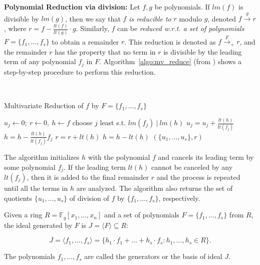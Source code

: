 {\bf Polynomial Reduction via division:} Let $f, g$ be
polynomials. If $lm(f)$ is divisible by $lm(g)$, then we say that $f$
{\it is reducible to} $r$ modulo $g$, denoted
$f\stackrel{g}{\textstyle\longrightarrow}r$, where
$r = f - {\frac{lt(f)}{lt(g)}} \cdot g$. Similarly, $f$ can be {\it
  reduced  w.r.t. a set of polynomials}  $F = \{f_1, \dots, f_s\}$ to
obtain a remainder $r$. This reduction is denoted as $f \stackrel{F}
{\textstyle \longrightarrow}_+ r$, and the remainder $r$ has the
property that no term in $r$ is divisible by the leading term of any
polynomial $f_j$ in $F$. Algorithm~\ref{algo:mv_reduce}
(from \cite{gb_book}) shows a step-by-step procedure to perform this
reduction.   

\ \\
\begin{algorithm}[hbt]
 \caption{Multivariate Reduction of $f$ by $F=\{f_1,\dots,f_s\}$}
 \label{algo:mv_reduce}
 \begin{algorithmic}[1]
 \State $u_j \gets 0; ~r \gets 0, ~h \gets f $ 
 \State choose $j$ least s.t. $lm(f_j) ~|~ lm(h)$
 \State $u_j = u_j + \frac{lt(h)}{lt(f_j)}$
 \State $h = h - \frac{lt(h)}{lt(f_j)} f_j$
 \Else
 \State $r = r+ lt(h)$
 \State $h = h - lt(h)$
 \EndIf
 \EndWhile
 \State \Return $(\{u_1,\dots,u_s\} , r)$
 \EndProcedure
 \end{algorithmic}
 \end{algorithm}


The algorithm initializes $h$ with the polynomial $f$ and cancels its
leading term by some  polynomial $f_j$. If the leading term $lt(h)$
cannot be canceled by any $lt(f_j)$, then it is added to the  final
remainder $r$ and the process is repeated until all the terms in $h$
are analyzed.  The algorithm also returns the set of quotients
$\{u_1,\dots,u_s\}$ of division of $f$ by  $\{f_1,\dots,f_s\}$,
respectively.  

\begin{Definition}
Given a ring $R=\mathbb{F}_q[x_1,\dots, x_n]$ and a set of polynomials
$F=\{f_1,\dots,f_s\}$ from $R$, the ideal generated by $F$ is $J =
\langle F \rangle \subseteq R$:

{\small
\begin{equation}
J = \langle f_1, \dots, f_s \rangle = \{ h_1\cdot f_1 + \dots+h_s\cdot
f_s:  h_1,\dots,h_s\in R\}.
\end{equation}
}

The polynomials $f_1,\dots,f_s$ are called the generators or the basis
of ideal $J$.
\end{Definition}

